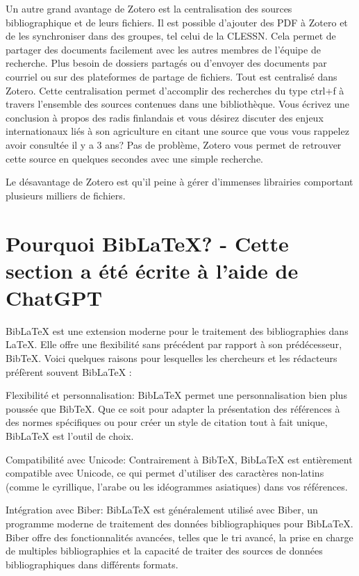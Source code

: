 \documentclass[
  letterpaper,
]{scrbook}
\begin{document}
Un autre grand avantage de Zotero est la centralisation des sources
bibliographique et de leurs fichiers. Il est possible d'ajouter des PDF
à Zotero et de les synchroniser dans des groupes, tel celui de la
CLESSN. Cela permet de partager des documents facilement avec les autres
membres de l'équipe de recherche. Plus besoin de dossiers partagés ou
d'envoyer des documents par courriel ou sur des plateformes de partage
de fichiers. Tout est centralisé dans Zotero. Cette centralisation
permet d'accomplir des recherches du type ctrl+f à travers l'ensemble
des sources contenues dans une bibliothèque. Vous écrivez une conclusion
à propos des radis finlandais et vous désirez discuter des enjeux
internationaux liés à son agriculture en citant une source que vous vous
rappelez avoir consultée il y a 3 ans? Pas de problème, Zotero vous
permet de retrouver cette source en quelques secondes avec une simple
recherche.

Le désavantage de Zotero est qu'il peine à gérer d'immenses librairies
comportant plusieurs milliers de fichiers.

\hypertarget{pourquoi-biblatex---cette-section-a-uxe9tuxe9-uxe9crite-uxe0-laide-de-chatgpt}{%
\section{Pourquoi BibLaTeX? - Cette section a été écrite à l'aide de
ChatGPT}\label{pourquoi-biblatex---cette-section-a-uxe9tuxe9-uxe9crite-uxe0-laide-de-chatgpt}}

BibLaTeX est une extension moderne pour le traitement des bibliographies
dans LaTeX. Elle offre une flexibilité sans précédent par rapport à son
prédécesseur, BibTeX. Voici quelques raisons pour lesquelles les
chercheurs et les rédacteurs préfèrent souvent BibLaTeX :

Flexibilité et personnalisation: BibLaTeX permet une personnalisation
bien plus poussée que BibTeX. Que ce soit pour adapter la présentation
des références à des normes spécifiques ou pour créer un style de
citation tout à fait unique, BibLaTeX est l'outil de choix.

Compatibilité avec Unicode: Contrairement à BibTeX, BibLaTeX est
entièrement compatible avec Unicode, ce qui permet d'utiliser des
caractères non-latins (comme le cyrillique, l'arabe ou les idéogrammes
asiatiques) dans vos références.

Intégration avec Biber: BibLaTeX est généralement utilisé avec Biber, un
programme moderne de traitement des données bibliographiques pour
BibLaTeX. Biber offre des fonctionnalités avancées, telles que le tri
avancé, la prise en charge de multiples bibliographies et la capacité de
traiter des sources de données bibliographiques dans différents formats.
\end{document}
